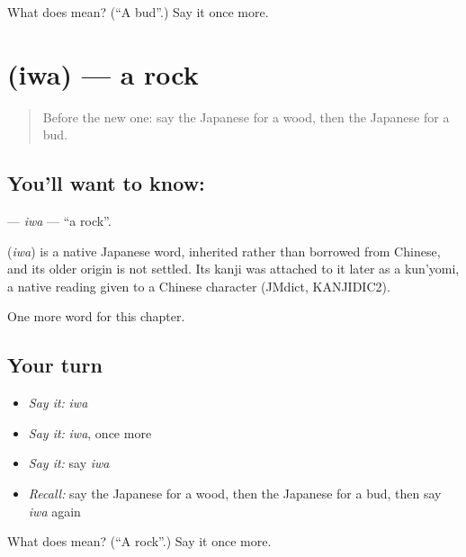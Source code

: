 \begin{tcolorbox}[breakable,colback=teal!4,colframe=teal!35!black,title={Before you move on}]
What does  mean? (\textquotedblleft{}A bud\textquotedblright{}.) Say it once more.
\end{tcolorbox}
\section[\texorpdfstring{\ja{いわ} (iwa)}{いわ (iwa)}]{ (iwa) — a rock}

\label{lesson:JA-C106-iwa}



\begin{quote}
Before the new one: say the Japanese for a wood, then the Japanese for a bud.
\end{quote}

\subsection*{You'll want to know: }
\textbf{} — \emph{iwa} — \textquotedblleft{}a rock\textquotedblright{}.

\begin{cousinweb}
\textbf{} (\emph{iwa}) is a native Japanese word, inherited rather than borrowed from Chinese, and its older origin is not settled. Its kanji was attached to it later as a kun'yomi, a native reading given to a Chinese character (JMdict, KANJIDIC2).
\end{cousinweb}

\begin{grammarlens}[title={What you've built}]
One more word for this chapter.
\end{grammarlens}

\subsection*{Your turn}
\begin{itemize}
\raggedright
  \item \emph{Say it:} \emph{iwa}
  \item \emph{Say it:} \emph{iwa}, once more
  \item \emph{Say it:} say \emph{iwa}
  \item \emph{Recall:} say the Japanese for a wood, then the Japanese for a bud, then say \emph{iwa} again
\end{itemize}

\begin{tcolorbox}[breakable,colback=teal!4,colframe=teal!35!black,title={Before you move on}]
What does  mean? (\textquotedblleft{}A rock\textquotedblright{}.) Say it once more.
\end{tcolorbox}
